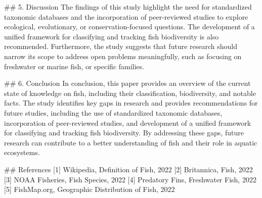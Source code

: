 ## 5. Discussion
The findings of this study highlight the need for standardized taxonomic databases and the incorporation of peer-reviewed studies to explore ecological, evolutionary, or conservation-focused questions. The development of a unified framework for classifying and tracking fish biodiversity is also recommended. Furthermore, the study suggests that future research should narrow its scope to address open problems meaningfully, such as focusing on freshwater or marine fish, or specific families.

## 6. Conclusion
In conclusion, this paper provides an overview of the current state of knowledge on fish, including their classification, biodiversity, and notable facts. The study identifies key gaps in research and provides recommendations for future studies, including the use of standardized taxonomic databases, incorporation of peer-reviewed studies, and development of a unified framework for classifying and tracking fish biodiversity. By addressing these gaps, future research can contribute to a better understanding of fish and their role in aquatic ecosystems.

## References
[1] Wikipedia, Definition of Fish, 2022
[2] Britannica, Fish, 2022
[3] NOAA Fisheries, Fish Species, 2022
[4] Predatory Fins, Freshwater Fish, 2022
[5] FishMap.org, Geographic Distribution of Fish, 2022